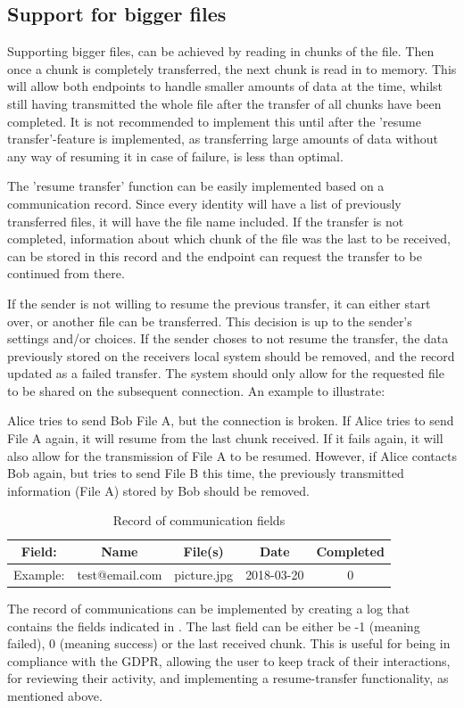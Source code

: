 	\subsection{Support for bigger files}
		Supporting bigger files, can be achieved by reading in chunks of the file. Then once a chunk is completely transferred, the next chunk is read in to memory. This will allow both endpoints to handle smaller amounts of data at the time, whilst still having transmitted the whole file after the transfer of all chunks have been completed. It is not recommended to implement this until after the 'resume transfer'-feature is implemented, as transferring large amounts of data without any way of resuming it in case of failure, is less than optimal.

		The 'resume transfer' function can be easily implemented based on a communication record. Since every identity will have a list of previously transferred files, it will have the file name included. If the transfer is not completed, information about which chunk of the file was the last to be received, can be stored in this record and the endpoint can request the transfer to be continued from there.

		If the sender is not willing to resume the previous transfer, it can either start over, or another file can be transferred. This decision is up to the sender's settings and/or choices. If the sender choses to not resume the transfer, the data previously stored on the receivers local system should be removed, and the record updated as a failed transfer. The system should only allow for the requested file to be shared on the subsequent connection. An example to illustrate:

		Alice tries to send Bob File A, but the connection is broken. If Alice tries to send File A again, it will resume from the last chunk received. If it fails again, it will also allow for the transmission of File A to be resumed. However, if Alice contacts Bob again, but tries to send File B this time, the previously transmitted information (File A) stored by Bob should be removed.
		\begin{table}
		\caption{Record of communication fields}
		\label{tab:comm_rec}
		\centering
		\begin{tabular}{|c|c|c|c|c|}
		\hline
		Field: &  Name & File(s) & Date & Completed\\
		\hline
		Example: & test@email.com & picture.jpg & 2018-03-20 & 0\\
		\hline
		\end{tabular}
		\end{table}
		The record of communications can be implemented by creating a log that contains the fields indicated in . The last field can be either be -1 (meaning failed), 0 (meaning success) or the last received chunk. This is useful for being in compliance with the GDPR, allowing the user to keep track of their interactions, for reviewing their activity, and implementing a resume-transfer functionality, as mentioned above.

